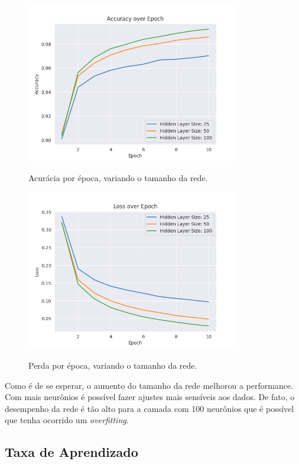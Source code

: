 \documentclass[a4paper]{article}
\begin{document}
\begin{figure}[H]
  \begin{center}
  {\includegraphics[height=7cm]{./images/Accuracy_over_Epoch_var_Hidden.png}}
  \end{center}
  \caption{Acurácia por época, variando o tamanho da rede. \label{fig:aeh}}
\end{figure}

\begin{figure}[H]
  \begin{center}
  {\includegraphics[height=7cm]{./images/Loss_over_Epoch_var_Hidden.png}}
  \end{center}
  \caption{Perda por época, variando o tamanho da rede. \label{fig:leh}}
\end{figure}

Como é de se esperar, o aumento do tamanho da rede melhorou a performance. Com mais neurônios é possível fazer ajustes mais sensíveis aos dados. De fato, o desempenho da rede é tão alto para a camada com 100 neurônios que é possível que tenha ocorrido um \textit{overfitting}.

\subsection{Taxa de Aprendizado}%
\label{sub:Taxa de Aprendizado}
\end{document}
